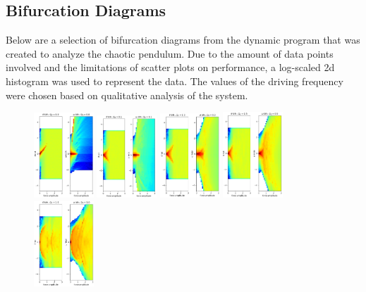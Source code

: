 \documentclass[11pt]{article} %
\begin{document}
    \subsection{Bifurcation Diagrams}
    Below are a selection of bifurcation diagrams from the dynamic program that was created to analyze the chaotic pendulum. Due to the
    amount of data points involved and the limitations of scatter plots on performance, a log-scaled 2d histogram was used to represent the
    data. The values of the driving frequency were chosen based on qualitative analysis of the system.
    \begin{figure}[H]
        \centering
        \includegraphics[width=0.2\textwidth]{bfn_0.0.png}
        \includegraphics[width=0.2\textwidth]{bfn_0.15.png}
        \includegraphics[width=0.2\textwidth]{bfn_0.3.png}
        \includegraphics[width=0.2\textwidth]{bfn_0.5.png}
        \includegraphics[width=0.2\textwidth]{bfn_1.0.png}

\end{figure}
\end{document}

